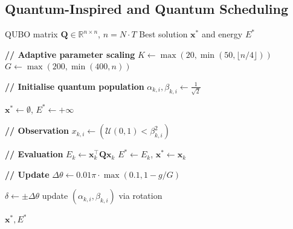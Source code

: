 \begin{appendices}
\section{Quantum-Inspired and Quantum Scheduling}

\begin{algorithm}[H]
\footnotesize
\setlength{\baselineskip}{9pt}
\caption{Quantum-Inspired Evolutionary Algorithm (QIEA) for QUBO Optimisation}
\label{alg:qiea}
\begin{algorithmic}[1]

\Require QUBO matrix $\mathbf{Q} \in \mathbb{R}^{n \times n}$, $n = N \cdot T$
\Ensure Best solution $\mathbf{x}^*$ and energy $E^*$

\Statex \textbf{// Adaptive parameter scaling}
\State $K \gets \max(20, \min(50, \lfloor n/4 \rfloor))$
\State $G \gets \max(200, \min(400, n))$

\Statex \textbf{// Initialise quantum population}
        \State $\alpha_{k,i}, \beta_{k,i} \gets \frac{1}{\sqrt{2}}$
    \EndFor
\EndFor

\State $\mathbf{x}^* \gets \emptyset$, \quad $E^* \gets +\infty$


\Statex \textbf{// Observation}
        \State $x_{k,i} \gets (\mathcal{U}(0,1) < \beta_{k,i}^2)$
    \EndFor
\EndFor

\Statex \textbf{// Evaluation}
    \State $E_k \gets \mathbf{x}_k^\top \mathbf{Q} \mathbf{x}_k$
        \State $E^* \gets E_k$, \quad $\mathbf{x}^* \gets \mathbf{x}_k$
    \EndIf
\EndFor

\Statex \textbf{// Update}
\State $\Delta \theta \gets 0.01\pi \cdot \max(0.1, 1 - g/G)$

            \State $\delta \gets \pm \Delta \theta$
            \State update $(\alpha_{k,i}, \beta_{k,i})$ via rotation
        \EndIf
    \EndFor
\EndFor

\EndFor

\State \Return $\mathbf{x}^*, E^*$

\end{algorithmic}
\end{algorithm}

\begin{algorithm}[H]
\footnotesize
\setlength{\baselineskip}{9pt}
\caption{QAOA Hardware Execution Pipeline}
\label{alg:qaoa_hardware}
\begin{algorithmic}[1]


\end{algorithmic}
\end{algorithm}
\end{appendices}

